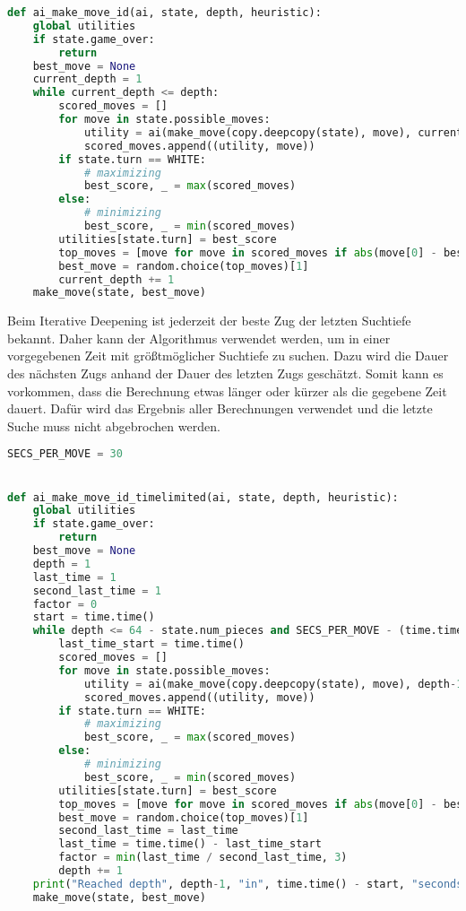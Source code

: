 \begin{lstlisting}[language=Python]
def ai_make_move_id(ai, state, depth, heuristic):
    global utilities
    if state.game_over:
        return
    best_move = None
    current_depth = 1
    while current_depth <= depth:
        scored_moves = []
        for move in state.possible_moves:
            utility = ai(make_move(copy.deepcopy(state), move), current_depth-1, heuristic, -math.inf, math.inf)
            scored_moves.append((utility, move))
        if state.turn == WHITE:
            # maximizing
            best_score, _ = max(scored_moves)
        else:
            # minimizing
            best_score, _ = min(scored_moves)
        utilities[state.turn] = best_score
        top_moves = [move for move in scored_moves if abs(move[0] - best_score) <= SELECTION_TOLERANCE]
        best_move = random.choice(top_moves)[1]
        current_depth += 1
    make_move(state, best_move)
\end{lstlisting}

Beim Iterative Deepening ist jederzeit der beste Zug der letzten
Suchtiefe bekannt. Daher kann der Algorithmus verwendet werden, um in
einer vorgegebenen Zeit mit größtmöglicher Suchtiefe zu suchen. Dazu
wird die Dauer des nächsten Zugs anhand der Dauer des letzten Zugs
geschätzt. Somit kann es vorkommen, dass die Berechnung etwas länger
oder kürzer als die gegebene Zeit dauert. Dafür wird das Ergebnis aller
Berechnungen verwendet und die letzte Suche muss nicht abgebrochen
werden.

\begin{lstlisting}[language=Python]
SECS_PER_MOVE = 30


def ai_make_move_id_timelimited(ai, state, depth, heuristic):
    global utilities
    if state.game_over:
        return
    best_move = None
    depth = 1
    last_time = 1
    second_last_time = 1
    factor = 0
    start = time.time()
    while depth <= 64 - state.num_pieces and SECS_PER_MOVE - (time.time() - start) >= factor * last_time:
        last_time_start = time.time()
        scored_moves = []
        for move in state.possible_moves:
            utility = ai(make_move(copy.deepcopy(state), move), depth-1, heuristic, -math.inf, math.inf)
            scored_moves.append((utility, move))
        if state.turn == WHITE:
            # maximizing
            best_score, _ = max(scored_moves)
        else:
            # minimizing
            best_score, _ = min(scored_moves)
        utilities[state.turn] = best_score
        top_moves = [move for move in scored_moves if abs(move[0] - best_score) <= SELECTION_TOLERANCE]
        best_move = random.choice(top_moves)[1]
        second_last_time = last_time
        last_time = time.time() - last_time_start
        factor = min(last_time / second_last_time, 3)
        depth += 1
    print("Reached depth", depth-1, "in", time.time() - start, "seconds")
    make_move(state, best_move)
\end{lstlisting}
